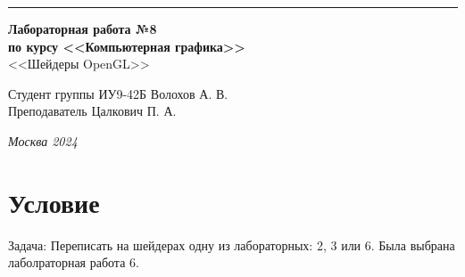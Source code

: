 \documentclass[a4paper, 14pt]{extarticle}
\begin{document}
\begin{titlepage}
\vspace*{-16pt}
\hspace{30pt}\rule{0.866\textwidth}{0.4pt}
  
\vspace{11em}

\begin{center}
\Large {\bf Лабораторная работа №8 } \\
\large {\bf по курсу <<Компьютерная графика>>} \\
\large <<Шейдеры OpenGL>>
\end{center}\normalsize

\vspace{8em}


\begin{flushright}
  {Студент группы ИУ9-42Б Волохов А. В.\hspace*{15pt} \\
  \vspace{2ex}
  Преподаватель Цалкович П. А.\hspace*{15pt}}
\end{flushright}

\bigskip

\vfill


\begin{center}
\textsl{Москва 2024}
\end{center}
\end{titlepage}

\renewcommand{\ttdefault}{pcr}

\setlength{\tabcolsep}{3pt}
\newpage
\setcounter{page}{2}

\section{Условие}\label{Sect::task}
\par
Задача: Переписать на шейдерах одну из лабораторных: 2, 3 или 6. Была выбрана лаболраторная работа 6.
\end{document}
